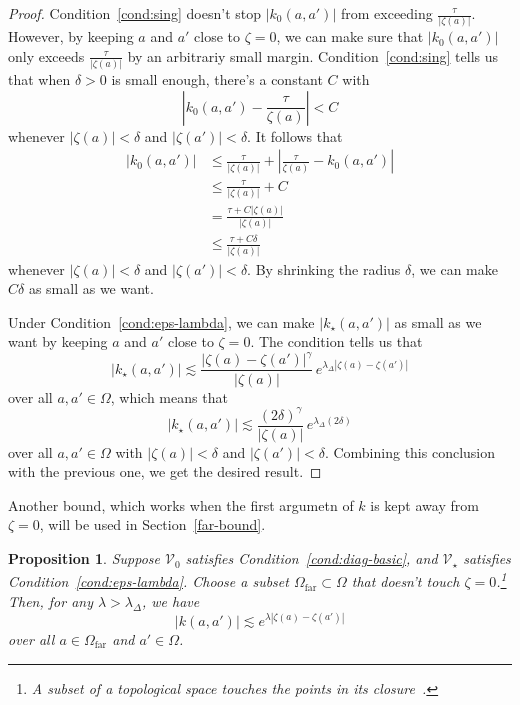 \documentclass{article}
\theoremstyle{plain}
\newtheorem{prop}{Proposition}
\newcommand{\hardpart}{\mathcal{V}_0}
\newcommand{\softpart}{\mathcal{V}_\star}
\newcommand{\kerwhole}{k}
\newcommand{\hardker}{k_0}
\newcommand{\softker}{k_\star}
\newcommand{\domain}{\Omega}
\begin{document}
\begin{proof}
Condition~\eqref{cond:sing} doesn't stop $|\hardker(a, a')|$ from exceeding $\frac{\tau}{|\zeta(a)|}$. However, by keeping $a$ and $a'$ close to $\zeta = 0$, we can make sure that $|\hardker(a, a')|$ only exceeds $\frac{\tau}{|\zeta(a)|}$ by an arbitrariy small margin. Condition~\eqref{cond:sing} tells us that when $\delta > 0$ is small enough, there's a constant $C$ with
\[ \left| \hardker(a, a') - \frac{\tau}{\zeta(a)} \right| < C \]
whenever $|\zeta(a)| < \delta$ and $|\zeta(a')| < \delta$. It follows that
\begin{align*}
|\hardker(a,a')| &\leq \frac{\tau}{|\zeta(a)|}+\left\vert\frac{\tau}{\zeta(a)} - \hardker(a,a')\right\vert \\
&\leq \frac{\tau}{|\zeta(a)|} + C \\
&= \frac{\tau + C|\zeta(a)|}{|\zeta(a)|} \\
&\le \frac{\tau + C\delta}{|\zeta(a)|}
\end{align*}
whenever $|\zeta(a)| < \delta$ and $|\zeta(a')| < \delta$. By shrinking the radius $\delta$, we can make $C\delta$ as small as we want.

Under Condition~\eqref{cond:eps-lambda}, we can make $|\softker(a, a')|$ as small as we want by keeping $a$ and $a'$ close to $\zeta = 0$. The condition tells us that
\[ \big| \softker(a, a') \big| \lesssim\frac{|\zeta(a)-\zeta(a')|^\gamma}{|\zeta(a)|}\,e^{\lambda_\Delta|\zeta(a)-\zeta(a')|}\]
over all $a, a' \in \domain$, which means that
\[ \big| \softker(a, a') \big| \lesssim\frac{(2\delta)^\gamma}{|\zeta(a)|}\,e^{\lambda_\Delta(2\delta)}\]
over all $a, a' \in \domain$ with $|\zeta(a)| < \delta$ and $|\zeta(a')| < \delta$. Combining this conclusion with the previous one, we get the desired result.
\end{proof}
Another bound, which works when the first argumetn of $\kerwhole$ is kept away from $\zeta = 0$, will be used in Section~\ref{far-bound}.
\begin{prop}\label{prop:whole-ker-far-bound}
Suppose $\hardpart$ satisfies {\em Condition~\eqref{cond:diag-basic}}, and $\softpart$ satisfies {\em Condition~\eqref{cond:eps-lambda}}. Choose a subset $\domain_\text{far} \subset \domain$ that doesn't touch $\zeta = 0$.\footnote{A subset of a topological space {\em touches} the points in its closure~\cite[Chapter~5, Definition~2.11]{joshi1983gen-top}.} Then, for any $\lambda > \lambda_\Delta$, we have
\[ |\kerwhole(a,a')| \lesssim e^{\lambda |\zeta(a)-\zeta(a')|} \]
over all $a \in \domain_\text{far}$ and $a' \in \domain$.
\end{prop}
\end{document}

